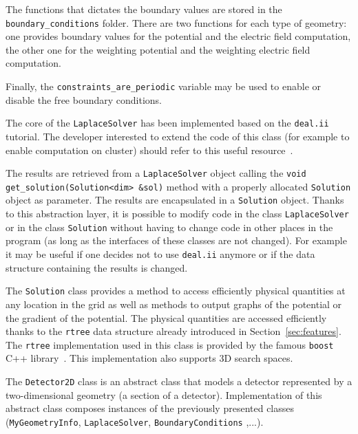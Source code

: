 \documentclass[11pt]{article}
\begin{document}
		The functions that dictates the boundary values are stored in the
		\texttt{boundary\_conditions} folder. There are two functions for each
		type of geometry: one provides boundary values for the potential and the electric
		field computation, the other one for the weighting potential and the weighting
		electric field computation.

		Finally, the \texttt{constraints\_are\_periodic} variable may be used to
		enable or disable the free boundary conditions.

		The core of the \texttt{LaplaceSolver} has been implemented based on the
		\texttt{deal.ii} tutorial. The developer interested to extend the code of this
		class (for example to enable computation on cluster) should refer to this
		useful resource~\cite{deal.iituto}.

		The results are retrieved from a \texttt{LaplaceSolver} object
		calling the \newline\lstinline{void get_solution(Solution<dim> &sol)}
		method with a properly allocated \texttt{Solution} object as parameter.
		The results are encapsulated in a \texttt{Solution} object. Thanks to this
		abstraction layer, it is possible to modify code in the class \texttt{LaplaceSolver}
		or in the class \texttt{Solution} without having to change code in other
		places in the program (as long as the interfaces of these classes are not
		changed). For example it may be useful if one decides not to use \texttt{deal.ii}
		anymore or if the data structure containing the results is changed.

		The \texttt{Solution} class provides a method to access efficiently physical
		quantities at any location in the grid as well as methods to output graphs
		of the potential or the gradient of the potential. The physical quantities
		are accessed efficiently thanks to the \texttt{rtree} data structure already
		introduced in Section~\ref{sec:features}. The \texttt{rtree} implementation
		used in this class is provided by the famous \texttt{boost} C++ library~\cite{boost.rtree}.
		This implementation also supports 3D search spaces.

		The \texttt{Detector2D} class is an abstract class that models a detector
		represented by a two-dimensional geometry (a section of a detector). Implementation
		of this abstract class composes instances of the previously presented classes
		(\texttt{MyGeometryInfo}, \texttt{LaplaceSolver}, \texttt{BoundaryConditions}
		,...).
\end{document}
